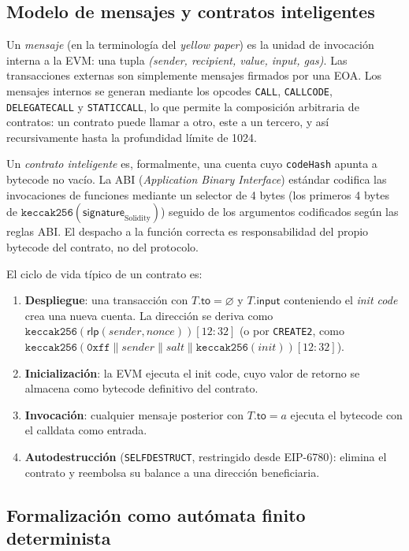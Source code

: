 \subsection{Modelo de mensajes y contratos inteligentes}
\label{sec:smart_contracts}

Un \emph{mensaje} (en la terminología del \emph{yellow paper}) es la unidad de invocación interna a la EVM: una tupla \emph{(sender, recipient, value, input, gas)}. Las transacciones externas son simplemente mensajes firmados por una EOA. Los mensajes internos se generan mediante los opcodes \texttt{CALL}, \texttt{CALLCODE}, \texttt{DELEGATECALL} y \texttt{STATICCALL}, lo que permite la composición arbitraria de contratos: un contrato puede llamar a otro, este a un tercero, y así recursivamente hasta la profundidad límite de 1024.

Un \emph{contrato inteligente} es, formalmente, una cuenta cuyo \texttt{codeHash} apunta a bytecode no vacío. La ABI (\emph{Application Binary Interface}) estándar codifica las invocaciones de funciones mediante un selector de 4 bytes (los primeros 4 bytes de $\texttt{keccak256}(\textsf{signature}_{\text{Solidity}})$) seguido de los argumentos codificados según las reglas ABI. El despacho a la función correcta es responsabilidad del propio bytecode del contrato, no del protocolo.

El ciclo de vida típico de un contrato es:
\begin{enumerate}
  \item \textbf{Despliegue}: una transacción con $T.\textsf{to} = \varnothing$ y $T.\textsf{input}$ conteniendo el \emph{init code} crea una nueva cuenta. La dirección se deriva como $\texttt{keccak256}(\textsf{rlp}(sender, nonce))[12{:}32]$ (o por \texttt{CREATE2}, como $\texttt{keccak256}(\texttt{0xff} \| sender \| salt \| \texttt{keccak256}(init))[12{:}32]$).
  \item \textbf{Inicialización}: la EVM ejecuta el init code, cuyo valor de retorno se almacena como bytecode definitivo del contrato.
  \item \textbf{Invocación}: cualquier mensaje posterior con $T.\textsf{to} = a$ ejecuta el bytecode con el calldata como entrada.
  \item \textbf{Autodestrucción} (\texttt{SELFDESTRUCT}, restringido desde EIP-6780): elimina el contrato y reembolsa su balance a una dirección beneficiaria.
\end{enumerate}

\subsection{Formalización como autómata finito determinista}
\label{sec:evm_fsm}

